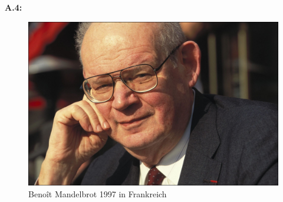 \noindent\textbf{A.4:}\label{app:4}
\begin{figure}[H]\label{fig:benoit-mandelbrot-picture}
\begin{center}
  \includegraphics[width=\textwidth]{images/benoit-mandelbrot}
  \caption{Benoît Mandelbrot 1997 in Frankreich~\cite{gaillarde_benoit_1997}}
\end{center}
\end{figure}